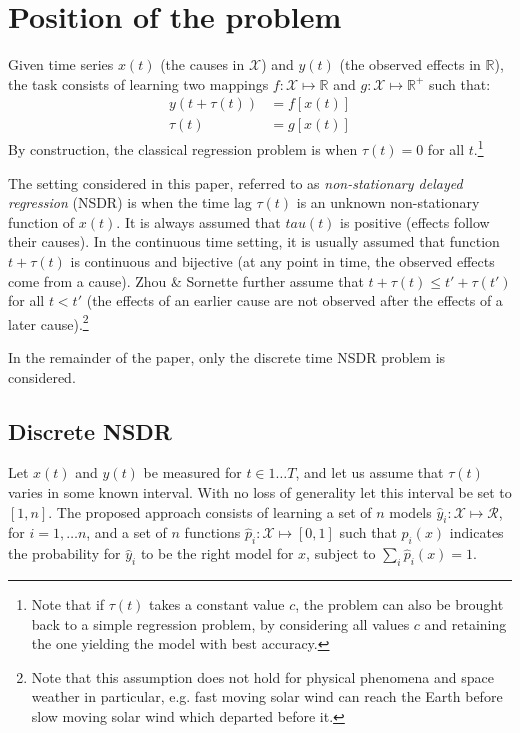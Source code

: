 \section{Position of the problem}\label{sec:formulation}
Given time series $x(t)$ (the causes in  $\mathcal{X}$) and $y(t)$ (the observed effects in  $\mathbb{R}$), the task consists of learning two mappings $f: \mathcal{X}  \mapsto \mathbb{R}$ and $g: \mathcal{X}  \mapsto \mathbb{R}^+$ such that:
\begin{align}
y(t + \tau(t)) & = f[x(t)]\label{eq:pb1}\\
\tau(t) & = g[x(t)]\label{eq:pb2} 
\end{align}
By construction, the classical regression problem is when $\tau(t) =0$ for all $t$.\footnote{Note that if $\tau(t)$ takes a constant value $c$, the problem can also be brought back to a simple regression problem, by considering all values $c$ and retaining the one yielding the model with best accuracy.} 

The setting considered in this paper, referred to as {\em non-stationary delayed regression} (NSDR) is when the time lag $\tau(t)$ is an unknown non-stationary function of $x(t)$. 
It is always assumed that $tau(t)$ is positive (effects follow their causes). In the continuous time setting, it is usually assumed that function $t + \tau(t)$ is continuous and bijective (at any point in time, the observed effects come from a cause). Zhou \& Sornette \cite{ZHOU2006195} further assume that $t + \tau(t) \le t' + \tau(t')$ for all $t< t'$ (the effects of an earlier cause are not observed after the effects of a later cause).\footnote{Note that this assumption does not hold for physical phenomena and space weather in particular, e.g. fast moving 
solar wind can reach the Earth before slow moving solar wind which departed before it.}

In the remainder of the paper, only the discrete time NSDR problem is considered.

\subsection{Discrete NSDR}
Let $x(t)$ and $y(t)$ be measured for $t \in 1 \ldots T$, and let us assume that $\tau(t)$ varies in some known interval. With no loss of generality let this interval be set to $[1, n]$. The proposed approach  consists of learning a set of $n$ models $\hat y_i: \mathcal{X} \mapsto \mathcal{R}$, for $i=1,\ldots n$, and a set of $n$ functions $\hat p_i:  \mathcal{X} \mapsto [0,1]$ such that $p_i(x)$ indicates the probability for $\hat y_i$ to be the right model for $x$, subject to  $\sum_i \hat p_i(x) = 1$.

